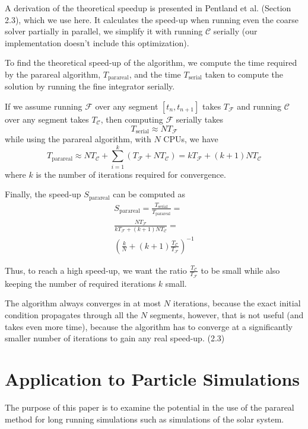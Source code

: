 \documentclass[conference]{IEEEtran}
\begin{document}
A derivation of the theoretical speedup is presented in Pentland et al. \cite{speedup} (Section 2.3), which we use here. It calculates the speed-up when running even the coarse solver partially in parallel, we simplify it with running $\mathcal{C}$ serially (our implementation doesn't include this optimization). 

To find the theoretical speed-up of the algorithm, we compute the time required by the parareal algorithm, $T_\text{parareal}$, and the time $T_\text{serial}$ taken to compute the solution by running the fine integrator serially. 

If we assume running $\mathcal{F}$ over any segment $[t_n, t_{n+1}]$ takes $T_\mathcal{F}$ and running $\mathcal{C}$ over any segment takes $T_\mathcal{C}$, then computing $\mathcal{F}$ serially takes
$$
T_\text{serial} \approx NT_\mathcal{F}
$$
while using the parareal algorithm, with $N$ CPUs, we have
$$
T_\text{parareal} \approx NT_\mathcal{C} + \sum_{i=1}^{k}\left(T_\mathcal{F} + NT_\mathcal{C}\right) = kT_\mathcal{F} + (k+1)NT_\mathcal{C}
$$
where $k$ is the number of iterations required for convergence.

Finally, the speed-up $S_\text{parareal}$ can be computed as
\begin{multline}
S_\text{parareal} = \frac{T_\text{serial}}{T_\text{parareal}} = \\\frac{NT_\mathcal{F}}{kT_\mathcal{F} + (k+1)NT_\mathcal{C}} = \\\left(\frac{k}{N} + (k+1)\frac{T_\mathcal{C}}{T_\mathcal{F}}\right)^{-1}
\end{multline}

Thus, to reach a high speed-up, we want the ratio $\frac{T_\mathcal{C}}{T_\mathcal{F}}$ to be small while also keeping the number of required iterations $k$ small. \cite{speedup}

The algorithm always converges in at most $N$ iterations, because the exact initial condition propagates through all the $N$ segments, however, that is not useful (and takes even more time), because the algorithm has to converge at a significantly smaller number of iterations to gain any real speed-up. \cite{speedup} (2.3)

\section{Application to Particle Simulations}
The purpose of this paper is to examine the potential in the use of the parareal method for long running simulations such as simulations of the solar system. 
\end{document}
